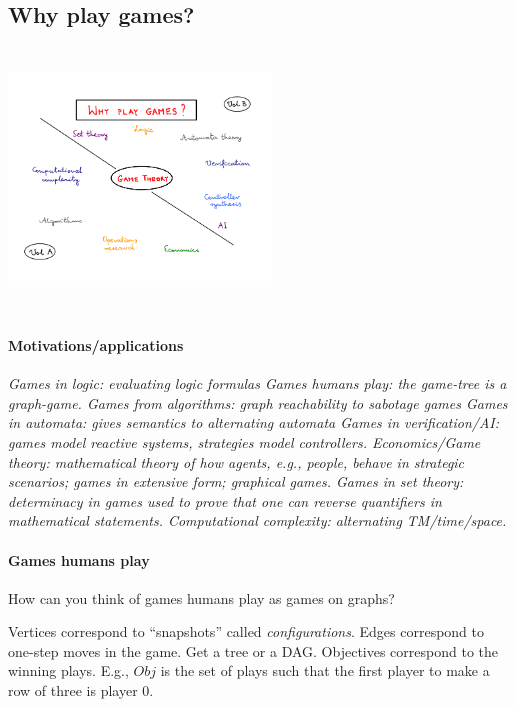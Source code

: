 \documentclass[a4paper,10pt]{article}
\begin{document}
\subsection{Why play games?}

\begin{center}\includegraphics[width=7cm,height=7cm]{whyplay.png} \end{center}


\paragraph{Motivations/applications}

\it
\- Games in logic: evaluating logic formulas
\- Games humans play: the game-tree is a graph-game.
\- Games from algorithms: graph reachability to sabotage games
\- Games in automata: gives semantics to alternating automata 
\- Games in verification/AI: games model reactive systems, strategies model controllers.
\- Economics/Game theory: mathematical theory of how agents, e.g., people, 
behave in strategic scenarios; games in extensive form; graphical games.
\- Games in set theory: determinacy in games used to prove that one can 
reverse quantifiers in mathematical statements.
\- Computational complexity: alternating TM/time/space.
\ti



\paragraph{Games humans play}

\begin{question}
 How can you think of games humans play as games on graphs?
\end{question}

\en
\- Vertices correspond to ``snapshots'' called \emph{configurations}.
\- Edges correspond to one-step moves in the game. Get a tree or a DAG.
\- Objectives correspond to the winning plays. E.g., $Obj$ is the set of plays such that the first player to make a row of three is player 0.
\ne
\end{document}
